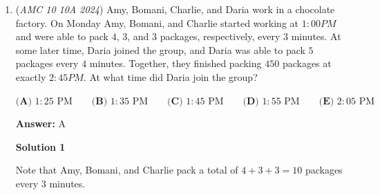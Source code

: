 \begin{enumerate}
\textbf{Solution 2}

We have $abc = 60$. Let $a$ be positive, and let $b$ and $c$ be negative. Then we need $a > |b + c|$. If $a = 6$, then $|b + c|$ is at least $7$, so this doesn't work. If $a = 10$, then $(b,c) = (-6,-1)$ works, giving $10 - 7 = \boxed{\textbf{(B) }3}$




\textbf{Solution 3}

We can see that the most optimal solution would be $1$ positive integer and $2$ negative ones (as seen in solution 1). Let the three integers be $x$, $y$, and $z$, and let $x$ be positive and $y$ and $z$ be negative. If we want the optimal solution, we want the negative numbers to be as large as possible. so the answer should be $-60 \cdot -1 \cdot 1$, where $-60 - 1 + 1 = -60$... right?

 No! Our sum must be positive, so that would be invalid! We see that -$30, -20, -15$, and $-10$ are too less to allow the sum to be positive. For example, $-15 = z. -15xy=60$, so $xy = -4$. For $xy$ to be the most positive, we will have $4$ and $-1$. Yet, $-15+4-1$ is still negative. After $-10$, the next factor of $60$ would be $-6$. if $z$ = $-6$, $xy = -10$. This might be positive! Now, if we have $z = -6, y = -1$, and $x = 10, x + y + z = 3$. It cannot be smaller because $x = 5$ and $y = -2$ would result in $x + y + z$ being negative. Therefore, our answer would be $\boxed{\textbf{(B) }3}$.

 Tiny minor edits made by SuperVince1

 


	\item (\textit{AMC 10 10A 2024}) Amy, Bomani, Charlie, and Daria work in a chocolate factory. On Monday Amy, Bomani, and Charlie started working at $1:00 PM$ and were able to pack $4$, $3$, and $3$ packages, respectively, every $3$ minutes. At some later time, Daria joined the group, and Daria was able to pack $5$ packages every $4$ minutes. Together, they finished packing $450$ packages at exactly $2:45 PM$. At what time did Daria join the group?


 $\textbf{(A) }1:25\text{ PM}\qquad\textbf{(B) }1:35\text{ PM}\qquad\textbf{(C) }1:45\text{ PM}\qquad\textbf{(D) }1:55\text{ PM}\qquad\textbf{(E) }2:05\text{ PM}$

 \textbf{Answer: }A



\textbf{Solution 1}

Note that Amy, Bomani, and Charlie pack a total of $4+3+3=10$ packages every $3$ minutes.


\end{enumerate}
